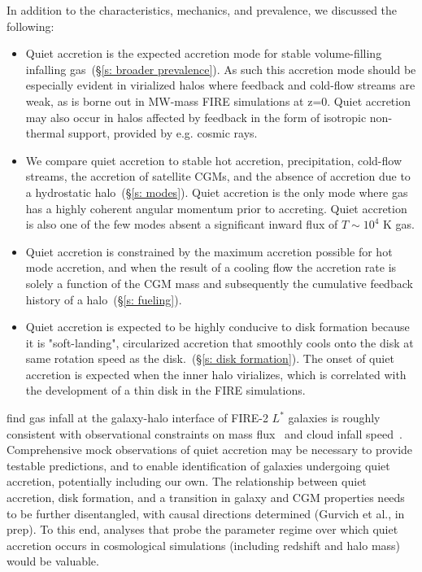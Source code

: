 \documentclass[fleqn,usenatbib]{mnras}
\begin{document}
In addition to the characteristics, mechanics, and prevalence, we discussed the following:
\begin{itemize}
    \item Quiet accretion is the expected accretion mode for stable volume-filling infalling gas~(\S\ref{s: broader prevalence}).
    As such this accretion mode should be especially evident in virialized halos where feedback and cold-flow streams are weak, as is borne out in MW-mass FIRE simulations at z=0.
    Quiet accretion may also occur in halos affected by feedback in the form of isotropic non-thermal support, provided by e.g. cosmic rays.
    \item We compare quiet accretion to stable hot accretion, precipitation, cold-flow streams, the accretion of satellite CGMs, and the absence of accretion due to a hydrostatic halo~(\S\ref{s: modes}).
    Quiet accretion is the only mode where gas has a highly coherent angular momentum prior to accreting.
    Quiet accretion is also one of the few modes absent a significant inward flux of $T\sim 10^4$ K gas.
    \item Quiet accretion is constrained by the maximum accretion possible for hot mode accretion, and when the result of a cooling flow the accretion rate is solely a function of the CGM mass and subsequently the cumulative feedback history of a halo~(\S\ref{s: fueling}).
    \item Quiet accretion is expected to be highly conducive to disk formation because it is "soft-landing", circularized accretion that smoothly cools onto the disk at same rotation speed as the disk.~(\S\ref{s: disk formation}).
    The onset of quiet accretion is expected when the inner halo virializes, which is correlated with the development of a thin disk in the FIRE simulations.
\end{itemize}

\cite{Trapp2021} find gas infall at the galaxy-halo interface of FIRE-2 $L^*$ galaxies is roughly consistent with observational constraints on mass flux~\citep[e.g.][]{Putman2012, Rohser2016} and cloud infall speed~\citep[e.g.][]{Zheng2017, Werk2019, Bish2019, Ho2020}.
Comprehensive mock observations of quiet accretion may be necessary to provide testable predictions, and to enable identification of galaxies undergoing quiet accretion, potentially including our own.
The relationship between quiet accretion, disk formation, and a transition in galaxy and CGM properties needs to be further disentangled, with causal directions determined (Gurvich et al., in prep).
To this end, analyses that probe the parameter regime over which quiet accretion occurs in cosmological simulations (including redshift and halo mass) would be valuable.
\end{document}
